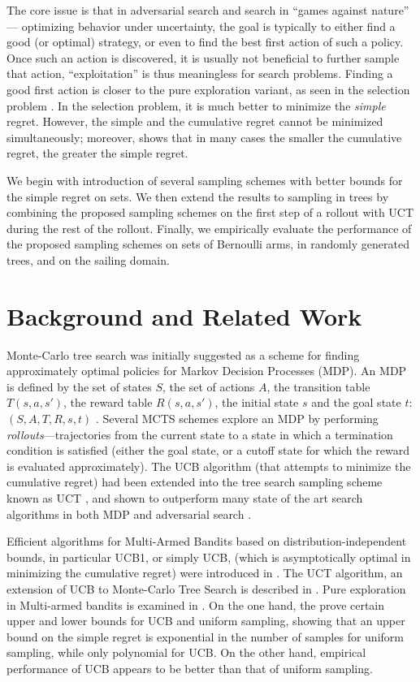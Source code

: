 \documentclass[letterpaper]{article}
\begin{document}
The core issue is that in adversarial search
and search in ``games against nature'' --- optimizing behavior under
uncertainty, the goal is typically to either find a good (or optimal)
strategy, or even to find the best first action of such a policy. Once
such an action is discovered, it is usually not beneficial to further sample
that action, ``exploitation'' is thus meaningless for search
problems. Finding a good first action is closer to the pure
exploration variant, as seen in the selection problem
\cite{Bubeck.pure,TolpinShimony.blinkered}. In the selection problem,
it is much better to minimize the \emph{simple} regret.  However, the
simple and the cumulative regret cannot be minimized simultaneously;
moreover, \cite{Bubeck.pure} shows that in many cases the smaller the
cumulative regret, the greater the simple regret.

We begin with introduction of several sampling schemes with better
bounds for the simple regret on sets. We then extend the results to
sampling in trees by combining the proposed sampling schemes on the
first step of a rollout with UCT during the rest of the
rollout. Finally, we empirically evaluate the performance of the
proposed sampling schemes on sets of Bernoulli arms, in randomly
generated trees, and on the sailing domain.

\section{Background and Related Work}
\label{sec:related-work}

Monte-Carlo tree search was initially suggested as a scheme for
finding approximately optimal policies for Markov Decision Processes (MDP).
An MDP is defined by the set of states $S$, the set of actions $A$, the transition table
$T(s, a, s')$, the reward table $R(s, a, s')$, the initial state $s$
and the goal state $t$: $(S, A, T, R, s, t)$ \cite{Russell.aima}.
Several MCTS schemes explore an MDP by performing \emph{rollouts}---trajectories from the
current state to a state in which a termination condition is satisfied
(either the goal state, or a cutoff state for which the reward is
evaluated approximately). The UCB algorithm (that attempts to minimize
the cumulative regret) \cite{Auer.ucb} had been extended into the tree
search sampling scheme known as UCT \cite{Kocsis.uct}, and shown to outperform
many state of the art search algorithms in both MDP and adversarial search \cite{Eyerich.ctp}. %

Efficient algorithms for Multi-Armed Bandits based on
distribution-independent bounds, in particular UCB1, or simply UCB, (which is
asymptotically optimal in minimizing the cumulative regret)  were introduced in
\cite{Auer.ucb}. The UCT algorithm, an extension of UCB to
Monte-Carlo Tree Search is described in \cite{Kocsis.uct}. Pure
exploration in Multi-armed bandits is examined in
\cite{Bubeck.pure}. On the one hand, the \cite{Bubeck.pure} prove certain upper
and lower bounds for UCB and uniform sampling, showing that an upper
bound on the simple regret is exponential in the number of samples for
uniform sampling, while only polynomial for UCB. On the other hand,
empirical performance of UCB appears to be better than that of uniform
sampling. 
\end{document}
